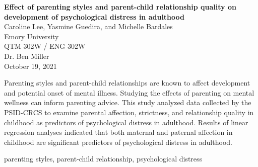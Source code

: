 \documentclass[12pt,letterpaper]{article}
\begin{document}

\vspace*{\fill}

\begin{center}
	
\doublespacing
\noindent \textbf{Effect of parenting styles and parent-child relationship quality on development of psychological distress in adulthood}
\vspace{0.8cm}
\\ Caroline Lee, Yasmine Guedira, and Michelle Bardales
\\ Emory University
\\ QTM 302W / ENG 302W
\\ Dr. Ben Miller
\\ October 19, 2021
	
\vspace*{\fill}


\pagebreak 


\end{center}
\doublespacing

\indent Parenting styles and parent-child relationships are known to affect development and potential onset of mental illness. Studying the effects of parenting on mental wellness can inform parenting advice. This study analyzed data collected by the PSID-CRCS to examine parental affection, strictness, and relationship quality in childhood as predictors of psychological distress in adulthood. Results of linear regression analyses indicated that both maternal and paternal affection in childhood are significant predictors of psychological distress in adulthood. 

 parenting styles, parent-child relationship, psychological distress


\begin{center}
\end{center}
\end{document}
